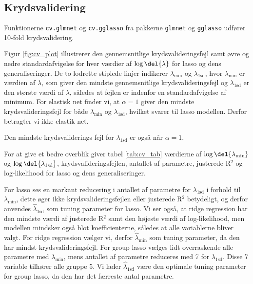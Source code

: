 \subsection{Krydsvalidering}
Funktionerne \texttt{cv.glmnet} og \texttt{cv.gglasso} fra pakkerne \texttt{glmnet} og \texttt{gglasso} udfører 10-fold krydsvalidering.

Figur \ref{fig:cv_plot} illustrerer den gennemsnitlige krydsvalideringsfejl samt øvre og nedre standardafvigelse for hver værdier af $\log \del{\lambda}$ for lasso og dens generaliseringer. 
De to lodrette stiplede linjer indikerer \(\lambda_{\text{min}}\) og \(\lambda_\text{1sd}\), hvor \(\lambda_{\text{min}}\) er værdien af \(\lambda\), som giver den mindste gennemsnitlige krydsvalideringsfejl og \(\lambda_\text{1sd}\) er den største værdi af \(\lambda\), således at fejlen er indenfor en standardafvigelse af minimum. 
For elastisk net finder vi, at $\alpha =1$ giver den mindste krydsvalideringsfejl for både \(\lambda_\text{min}\) og  \(\lambda_\text{1sd}\), hvilket svarer til lasso modellen.  Derfor betragter vi ikke elastik net. 

Den mindste krydsvaliderings fejl for $\lambda_\text{1sd}$ er også når $\alpha = 1$. 
%



For at give et bedre overblik giver tabel \ref{tab:cv_tab} værdierne af $\log \del{ \lambda_{\min}}$ og $\log \del{ \lambda_{1\text{sd}}}$, krydsvalideringsfejlen, antallet af parametre, justerede R$^2$ og log-likelihood for lasso og dens generaliseringer.

For lasso ses en markant reducering i antallet af parametre for $\lambda_{1\text{sd}}$ i forhold til $\lambda_{\min}$, dette øger ikke krydsvalideringsfejlen eller justerede R$^2$ betydeligt, og derfor anvendes $\widehat{\lambda}_{1\text{sd}}$ som tuning parameter for lasso. 
Vi ser også, at ridge regression har den mindste værdi af justerede R$^2$ samt den højeste værdi af log-likelihood, men modellen mindsker også blot koefficienterne, således at alle variablerne bliver valgt. 
For ridge regression vælger vi, derfor $\widehat{\lambda}_{\min}$ som tuning parameter, da den har mindst krydsvalideringsfejl.
For group lasso vælges lidt overraskende alle parametre med \(\lambda_\text{min}\), mens antallet af parametre reduceres med 7 for $\lambda_{1\text{sd}}$. Disse 7 variable tilhører alle gruppe 5.
Vi lader $\widehat{\lambda}_{1\text{sd}}$ være den optimale tuning parameter for group lasso, da den har det færreste antal parametre. 

